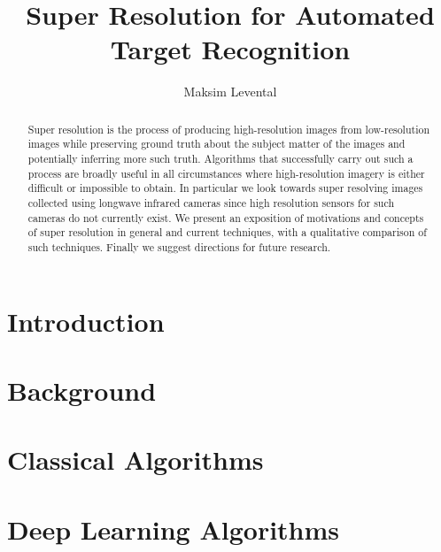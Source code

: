 \documentclass[journal]{IEEEtran}
\begin{document}
    \title{Super Resolution for Automated Target Recognition}
    \author{Maksim Levental}
    \maketitle
    \etocruledstyle[1]{}


    \begin{abstract}
        Super resolution is the process of producing high-resolution images from low-resolution images while preserving ground truth about the subject matter of the images and potentially inferring more such truth.
        Algorithms that successfully carry out such a process are broadly useful in all circumstances where high-resolution imagery is either difficult or impossible to obtain.
        In particular we look towards super resolving images collected using longwave infrared cameras since high resolution sensors for such cameras do not currently exist.
        We present an exposition of motivations and concepts of super resolution in general and current techniques, with a qualitative comparison of such techniques.
        Finally we suggest directions for future research.
    \end{abstract}

    \section{Introduction}\label{sec:introduction}
    \localtableofcontents
    

    \section{Background}\label{sec:background}
    \localtableofcontents
    

    \section{Classical Algorithms}\label{sec:classical-algorithms}
    \localtableofcontents
    

    \section{Deep Learning Algorithms}\label{sec:deep-learning-algorithms}
    \localtableofcontents
    
\end{document}
